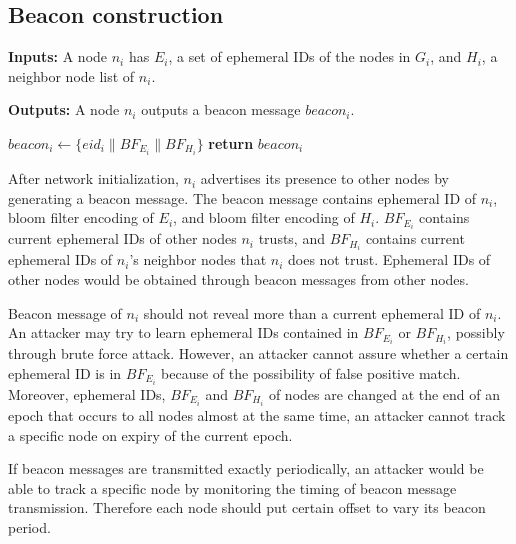 \documentclass[11pt]{article}
\begin{document}
\subsection{Beacon construction}
\begin{framed}
\noindent
\textbf{Inputs:} A node $n_i$ has $E_i$, a set of ephemeral IDs of the nodes in $G_i$, and $H_i$, a neighbor node list of $n_i$.

\noindent
\textbf{Outputs:} A node $n_i$ outputs a beacon message $beacon_i$.\\

\begin{algorithmic}[1]
    \State $beacon_i \leftarrow \{ eid_i \| BF_{E_i} \| BF_{H_i} \}$         
    \State \textbf{return} $beacon_i$
  \EndProcedure  
\end{algorithmic}
\end{framed}

After network initialization, $n_i$ advertises its presence to other nodes by generating a beacon message.  
The beacon message contains ephemeral ID of $n_i$, bloom filter encoding of $E_i$, and bloom filter encoding of $H_i$.  
$BF_{E_i}$ contains current ephemeral IDs of other nodes $n_i$ trusts, and $BF_{H_i}$ contains current ephemeral IDs of $n_i$'s neighbor nodes that $n_i$ does not trust.  
Ephemeral IDs of other nodes would be obtained through beacon messages from other nodes. 

Beacon message of $n_i$ should not reveal more than a current ephemeral ID of $n_i$. 
An attacker may try to learn ephemeral IDs contained in $BF_{E_i}$ or $BF_{H_i}$, possibly through brute force attack. 
However, an attacker cannot assure whether a certain ephemeral ID is in $BF_{E_i}$ because of the possibility of false positive match.  
Moreover, ephemeral IDs, $BF_{E_i}$ and $BF_{H_i}$ of nodes are changed at the end of an epoch that occurs to all nodes almost at the same time, an attacker cannot track a specific node on expiry of the current epoch. 

If beacon messages are transmitted exactly periodically, an attacker would be able to track a specific node by monitoring the timing of beacon message transmission. 
Therefore each node should put certain offset to vary its beacon period. 
\end{document}
